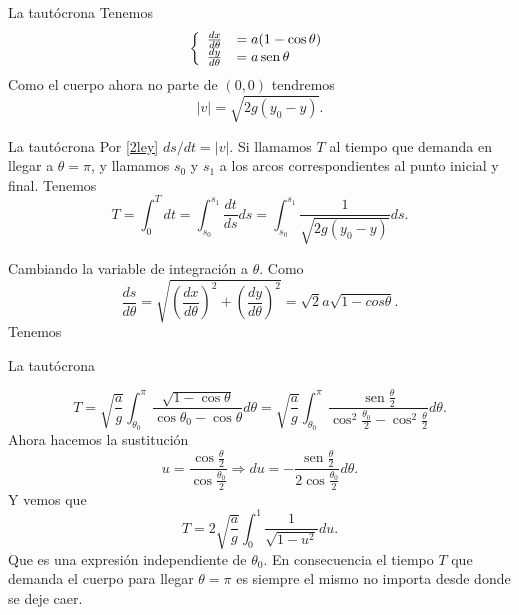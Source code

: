 \documentclass[handout,hyperref={colorlinks=true}]{beamer}
\DeclareMathOperator{\sen}{sen}
\newcommand{\nl}{\onslide<+-> }
\begin{document}
  
  \begin{frame}{La tautócrona}
\nl Tenemos
\[
 \left\{ \begin{array}{l l}
 \frac{dx}{d\theta}&=a(1-\cos\theta)\\
 \frac{dy}{d\theta}&=a\sen\theta 
 \end{array}\right.
\]
% 
Como el cuerpo ahora no parte de $(0,0)$ tendremos
\[|v|=\sqrt{2g(y_0-y)}.\]

  \end{frame}
  
  \begin{frame}{La tautócrona}
Por \eqref{2ley} $ds/dt=|v|$. Si llamamos $T$ al tiempo que demanda en llegar a $\theta=\pi$, y llamamos  $s_0$ y $s_1$ a los arcos correspondientes al punto inicial
y final.  Tenemos
 \[T=\int_0^Tdt=\int_{s_0}^{s_1}\frac{dt}{ds}ds=\int_{s_0}^{s_1}\frac{1}{\sqrt{2g(y_0-y)}}ds.\]
 
Cambiando la variable de integración a $\theta$. Como 
\[
 \frac{ds}{d\theta}=\sqrt{\left(\frac{dx}{d\theta}\right)^2+\left(\frac{dy}{d\theta}\right)^2}=\sqrt{2}a\sqrt{1-cos\theta}.
\]
 Tenemos

  \end{frame}
   \begin{frame}{La tautócrona}

\[T=\sqrt{\frac{a}{g}}\int_{\theta_0}^{\pi}\frac{\sqrt{1-\cos\theta}}{\cos\theta_0-\cos\theta}d\theta=
\sqrt{\frac{a}{g}}\int_{\theta_0}^{\pi}\frac{\sen\frac{\theta}{2}}{\cos^2\frac{\theta_0}{2}-\cos^2\frac{\theta}{2}}d\theta.
\]
Ahora hacemos la sustitución
\[u=\frac{\cos\frac{\theta}{2}}{\cos\frac{\theta_0}{2}}\Longrightarrow du=-\frac{\sen\frac{\theta}{2}}{2\cos\frac{\theta_0}{2}}d\theta.\]
Y vemos que
\[
 T=2\sqrt{\frac{a}{g}}\int_0^1\frac{1}{\sqrt{1-u^2}}du.
\]
Que es una expresión independiente de $\theta_0$. En consecuencia el tiempo $T$ que demanda  el cuerpo para llegar $\theta=\pi$ es siempre el mismo no importa
desde donde se deje caer.
  \end{frame} 
\end{document}
